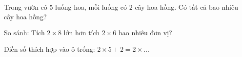 \begin{ex}
Trong vườn có 5 luống hoa, mỗi luống có 2 cây hoa hồng. Có tất cả bao nhiêu cây hoa hồng?
\end{ex}

\begin{ex}
So sánh: Tích $2 \times 8$ lớn hơn tích $2 \times 6$ bao nhiêu đơn vị?
\end{ex}

\begin{ex}
Điền số thích hợp vào ô trống: $2 \times 5 + 2 = 2 \times \dots$
\end{ex}
